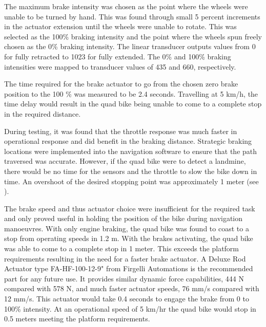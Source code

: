 \documentclass[main.tex]{subfiles}
\begin{document}
The maximum brake intensity was chosen as the point where the wheels were unable to be turned by hand. This was found through small 5 percent increments in the actuator extension until the wheels were unable to rotate. This was selected as the 100\% braking intensity and the point where the wheels spun freely chosen as the 0\% braking intensity. The linear transducer outputs values from 0 for fully retracted to 1023 for fully extended. The 0\% and 100\% braking intensities were mapped to transducer values of 435 and 660, respectively.

The time required for the brake actuator to go from the chosen zero brake position to the 100 \% was measured to be 2.4 seconds. Travelling at 5 km/h, the time delay would result in the quad bike being unable to come to a complete stop in the required distance.

During testing, it was found that the throttle response was much faster in operational response and did benefit in the braking distance. Strategic braking locations were implemented into the navigation software to ensure that the path traversed was accurate. However, if the quad bike were to detect a landmine, there would be no time for the sensors and the throttle to slow the bike down in time. An overshoot of the desired stopping point was approximately 1 meter (see ).

The brake speed and thus actuator choice were insufficient for the required task and only proved useful in holding the position of the bike during navigation manoeuvres. With only engine braking, the quad bike was found to coast to a stop from operating speeds in 1.2 m. With the brakes activating, the quad bike was able to come to a complete stop in 1 meter. This exceeds the platform requirements resulting in the need for a faster brake actuator. A Deluxe Rod Actuator type FA-HF-100-12-9" from Firgelli Automations is the recommended part for any future use. It provides similar dynamic force capabilities, 444 N compared with 578 N, and much faster actuator speeds, 76 mm/s compared with 12 mm/s. This actuator would take 0.4 seconds to engage the brake from 0 to 100\% intensity. At an operational speed of 5 km/hr the quad bike would stop in 0.5 meters meeting the platform requirements.
\end{document}
